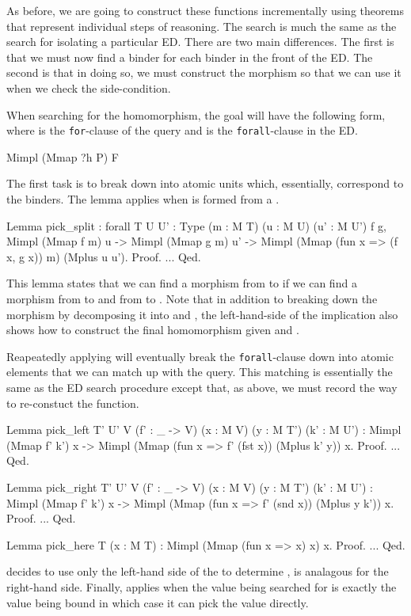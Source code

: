 \documentclass[preprint]{sigplanconf}
\begin{document}
As before, we are going to construct these functions incrementally using theorems that represent individual steps of reasoning.
The search is much the same as the search for isolating a particular ED.
There are two main differences.
The first is that we must now find a binder for each binder in the front of the ED.
The second is that in doing so, we must construct the morphism  so that we can use it when we check the side-condition.

When searching for the homomorphism, the goal will have the following form, where  is the {\tt for}-clause of the query and  is the {\tt forall}-clause in the ED.
\begin{coq}
Mimpl (Mmap ?h P) F
\end{coq}

The first task is to break  down into atomic units which, essentially, correspond to the binders.
The  lemma applies when  is formed from a .
\begin{coq}
Lemma pick_split
: forall {T U U' : Type} (m : M T) (u : M U) (u' : M U') f g,
  Mimpl (Mmap f m) u ->
  Mimpl (Mmap g m) u' ->
  Mimpl (Mmap (fun x => (f x, g x)) m) (Mplus u u').
Proof. ... Qed.
\end{coq}
This lemma states that we can find a morphism from  to  if we can find a morphism from  to  and from  to .
Note that in addition to breaking down the morphism by decomposing it into  and , the left-hand-side of the implication also shows how to construct the final homomorphism given  and .

Reapeatedly applying  will eventually break the {\tt forall}-clause down into atomic elements that we can match up with the query.
This matching is essentially the same as the ED search procedure except that, as above, we must record the way to re-constuct the  function.
\begin{coq}
Lemma pick_left {T' U' V} (f' : _ -> V) (x : M V) (y : M T') (k' : M U')
: Mimpl (Mmap f' k') x ->
  Mimpl (Mmap (fun x => f' (fst x)) (Mplus k' y)) x.
Proof. ... Qed.

Lemma pick_right {T' U' V} (f' : _ -> V) (x : M V) (y : M T') (k' : M U')
: Mimpl (Mmap f' k') x ->
  Mimpl (Mmap (fun x => f' (snd x)) (Mplus y k')) x.
Proof. ... Qed.

Lemma pick_here {T} (x : M T)
: Mimpl (Mmap (fun x => x) x) x.
Proof. ... Qed.
\end{coq}
 decides to use only the left-hand side of the  to determine ,  is analagous for the right-hand side.
Finally,  applies when the value being searched for is exactly the value being bound in which case it can pick the value directly.
\end{document}
